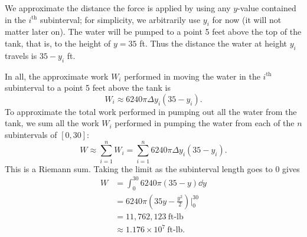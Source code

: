 \begin{example}
We approximate the distance the force is applied by using any $y$-value contained in the $i^{\text{th}}$ subinterval; for simplicity, we arbitrarily use $y_i$ for now (it will not matter later on). The water will be pumped to a point 5 feet above the top of the tank, that is, to the height of $y=35$ ft. Thus the distance the water at height $y_i$ travels is $35-y_i$ ft. 

In all, the approximate work $W_i$ performed in moving the water in the $i^{\text{th}}$ subinterval to a point 5 feet above the tank is 
\[W_i \approx 6240\pi\Delta y_i(35-y_i).\]
To approximate the total work performed in pumping out all the water from the tank, we sum all the work $W_i$ performed in pumping the water from each of the $n$ subintervals of $[0,30]$:
\[W \approx \sum_{i=1}^n W_i = \sum_{i=1}^n 6240\pi\Delta y_i(35-y_i).\]
This is a Riemann sum. Taking the limit as the subinterval length goes to 0 gives 
\begin{align*}
W 	&=	\int_0^{30} 6240\pi(35-y)\dd y \\
		&=  6240\pi\left(35y-\frac{y^2}2\right)\Big|_0^{30} \\
		&= 	11,762,123 \ \text{ft-lb}\\
		&\approx  1.176 \times 10^7 \ \text{ft-lb}.
\end{align*}
\end{example}


